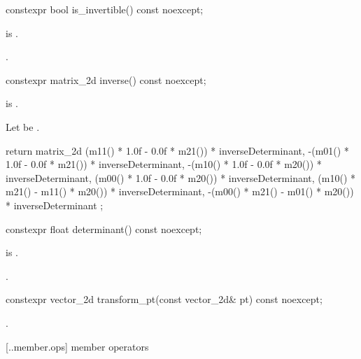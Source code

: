 %
\begin{itemdecl}
constexpr bool is_invertible() const noexcept;
\end{itemdecl}
\begin{itemdescr}
\pnum
\requires
{} is .

\pnum
\returns
{}.
\end{itemdescr}

%
\begin{itemdecl}
constexpr matrix_2d inverse() const noexcept;
\end{itemdecl}
\begin{itemdescr}
\pnum
\requires
{} is .

\pnum
\returns
Let  be .

\begin{codeblock}
return matrix_2d{
   (m11() * 1.0f - 0.0f * m21()) * inverseDeterminant,
  -(m01() * 1.0f - 0.0f * m21()) * inverseDeterminant,
  -(m10() * 1.0f - 0.0f * m20()) * inverseDeterminant,
   (m00() * 1.0f - 0.0f * m20()) * inverseDeterminant,
   (m10() * m21() - m11() * m20()) * inverseDeterminant,
  -(m00() * m21() - m01() * m20()) * inverseDeterminant
};
\end{codeblock}
\end{itemdescr}

%
\begin{itemdecl}
constexpr float determinant() const noexcept;
\end{itemdecl}
\begin{itemdescr}
\pnum
\requires
{} is .

\pnum
\returns
{}.
\end{itemdescr}

%
\begin{itemdecl}
constexpr vector_2d transform_pt(const vector_2d& pt) const noexcept;
\end{itemdecl}
\begin{itemdescr}
\pnum
\returns
{}.
\end{itemdescr}

 [\iotwod.\matrixtwod.member.ops] { member operators}

